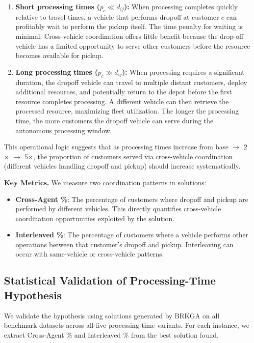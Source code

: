 \documentclass{article}
\begin{document}
\begin{enumerate}
\item \textbf{Short processing times ($p_c \ll d_{ij}$):} When processing completes quickly relative to travel times, a vehicle that performs dropoff at customer $c$ can profitably wait to perform the pickup itself. The time penalty for waiting is minimal. Cross-vehicle coordination offers little benefit because the drop-off vehicle has a limited opportunity to serve other customers before the resource becomes available for pickup.

\item \textbf{Long processing times ($p_c \gg d_{ij}$):} When processing requires a significant duration, the dropoff vehicle can travel to multiple distant customers, deploy additional resources, and potentially return to the depot before the first resource completes processing. A different vehicle can then retrieve the processed resource, maximizing fleet utilization. The longer the processing time, the more customers the dropoff vehicle can serve during the autonomous processing window.
\end{enumerate}

This operational logic suggests that as processing times increase from base $\to$ 2$\times$ $\to$ 5$\times$, the proportion of customers served via cross-vehicle coordination (different vehicles handling dropoff and pickup) should increase systematically.

\textbf{Key Metrics.} We measure two coordination patterns in solutions:

\begin{itemize}
\item \textbf{Cross-Agent \%}: The percentage of customers where dropoff and pickup are performed by different vehicles. This directly quantifies cross-vehicle coordination opportunities exploited by the solution.

\item \textbf{Interleaved \%}: The percentage of customers where a vehicle performs other operations between that customer's dropoff and pickup. Interleaving can occur with same-vehicle or cross-vehicle patterns.
\end{itemize}


\subsection{Statistical Validation of Processing-Time Hypothesis}

We validate the hypothesis using solutions generated by BRKGA on all benchmark datasets across all five processing-time variants. For each instance, we extract Cross-Agent \% and Interleaved \% from the best solution found.
\end{document}
